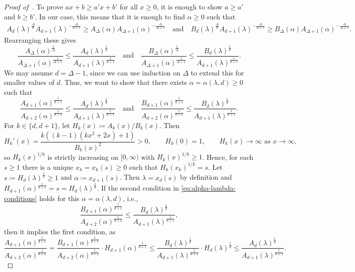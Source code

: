 \documentclass{article}
\numberwithin{equation}{section}
\theoremstyle{plain}
\theoremstyle{definition}
\theoremstyle{remark} %
\newcommand{\defeq}{\coloneqq}
\begin{document}
\begin{proof}[Proof of~]
To prove $ax+b\geq a'x+b'$ for all \(x\ge0\), it is enough to show $a\geq a'$ and $b\geq b'$. In our case, this means that it is enough to find \(\alpha\ge0\) such that
\begin{align*}
    A_d(\lambda)^{\frac{\Delta}{d}} A_{d+1}(\lambda)^{-\frac{\Delta}{d+1}}\ge A_\Delta(\alpha) A_{\Delta+1}(\alpha)^{-\frac{\Delta}{\Delta+1}}
    \quad\text{and}\quad 
    B_d(\lambda)^{\frac{\Delta}{d}} A_{d+1}(\lambda)^{-\frac{\Delta}{d+1}}
    \geq B_\Delta(\alpha) A_{\Delta+1}(\alpha)^{-\frac{\Delta}{\Delta+1}}.
\end{align*}
Rearranging these gives
\[
    \frac{A_\Delta(\alpha)^{\frac{1}{\Delta}}}{A_{\Delta+1}(\alpha)^{\frac{1}{\Delta+1}}} \le \frac{A_d(\lambda)^{\frac{1}{d}}}{A_{d+1}(\lambda)^{\frac{1}{d+1}}}
    \quad\text{and}\quad
    \frac{B_\Delta(\alpha)^{\frac{1}{\Delta}}}{A_{\Delta+1}(\alpha)^{\frac{1}{\Delta+1}}} \le \frac{B_d(\lambda)^{\frac{1}{d}}}{A_{d+1}(\lambda)^{\frac{1}{d+1}}}.
\]
We may assume \(d=\Delta-1\), since we can use induction on $\Delta$ to extend this for smaller values of \(d\). Thus, we want to show that there exists $\alpha=\alpha(\lambda,d)\geq 0$ such that
\begin{equation}\label{eq:alpha-lambda-conditions}
    \frac{A_{d+1}(\alpha)^{\frac{1}{d+1}}}{A_{d+2}(\alpha)^{\frac{1}{d+2}}} \le \frac{A_d(\lambda)^{\frac{1}{d}}}{A_{d+1}(\lambda)^{\frac{1}{d+1}}}
    \quad\text{and}\quad
    \frac{B_{d+1}(\alpha)^{\frac{1}{d+1}}}{A_{d+2}(\alpha)^{\frac{1}{d+2}}} \le \frac{B_d(\lambda)^{\frac{1}{d}}}{A_{d+1}(\lambda)^{\frac{1}{d+1}}}.
\end{equation}
For \(k\in \{d,d+1\}\), let \(H_k(x)\defeq A_k(x)/B_k(x)\).
Then
\begin{equation}\label{eq:Hk-property}
    H_k'(x) = \frac{k( (k-1)(kx^2+2x) + 1)}{B_k(x)^2} > 0,
    \qquad
    H_k(0)=1,
    \qquad
    H_k(x)\to\infty\text{ as }x\to\infty,
\end{equation}
so $H_k(x)^{1/k}$ is strictly increasing on $[0,\infty)$ with $H_k(x)^{1/k}\geq 1$.
Hence, for each \(s\ge1\) there is a unique \(x_k=x_k(s)\ge0\) such that \(H_k(x_k)^{1/k}=s\). Let \(s\defeq H_{d}(\lambda)^{\frac{1}{d}}\ge 1\) and \(\alpha\defeq x_{d+1}(s)\). Then \(\lambda=x_{d}(s)\) by definition and \(H_{d+1}(\alpha)^{\frac{1}{d+1}} = s= H_{d}(\lambda)^{\frac{1}{d}}\). If the second condition in \eqref{eq:alpha-lambda-conditions} holds for this $\alpha=\alpha(\lambda,d)$, i.e.,
\begin{equation}\label{eq:goal-reduced-1}
    \frac{B_{d+1}(\alpha)^{\frac{1}{d+1}}}{A_{d+2}(\alpha)^{\frac{1}{d+2}}} \le \frac{B_d(\lambda)^{\frac{1}{d}}}{A_{d+1}(\lambda)^{\frac{1}{d+1}}},
\end{equation}
then it implies the first condition, as
\[
    \frac{A_{d+1}(\alpha)^{\frac{1}{d+1}}}{A_{d+2}(\alpha)^{\frac{1}{d+2}}}
    = \frac{B_{d+1}(\alpha)^{\frac{1}{d+1}}}{A_{d+2}(\alpha)^{\frac{1}{d+2}}}
        \cdot H_{d+1}(\alpha)^{\frac{1}{d+1}}
    \le \frac{B_d(\lambda)^{\frac{1}{d}}}{A_{d+1}(\lambda)^{\frac{1}{d+1}}}
        \cdot H_{d}(\lambda)^{\frac{1}{d}}
    \le \frac{A_d(\lambda)^{\frac{1}{d}}}{A_{d+1}(\lambda)^{\frac{1}{d+1}}}.
\]


\end{proof}
\end{document}
